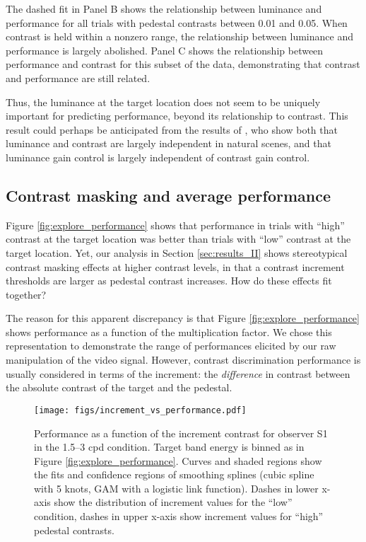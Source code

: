 \documentclass[11pt,a4paper]{article}
\begin{document}
{The dashed fit in Panel B shows the relationship between luminance and performance for all trials with pedestal contrasts between 0.01 and 0.05. 
When contrast is held within a nonzero range, the relationship between luminance and performance is largely abolished. Panel C shows the relationship between performance and contrast for this subset of the data, demonstrating that contrast and performance are still related. 

Thus, the luminance at the target location does not seem to be uniquely important for predicting performance, beyond its relationship to contrast. 
This result could perhaps be anticipated from the results of \citet{Mante2005}, who show both that luminance and contrast are largely independent in natural scenes, and that luminance gain control is largely independent of contrast gain control. 


\subsection{Contrast masking and average performance}
\label{app:contrast_masking}

Figure \ref{fig:explore_performance} shows that performance in trials with ``high'' contrast at the target location was better than trials with ``low'' contrast at the target location.
Yet, our analysis in Section \ref{sec:results_II} shows stereotypical contrast masking effects at higher contrast levels, in that a contrast increment thresholds are larger as pedestal contrast increases. 
How do these effects fit together?

The reason for this apparent discrepancy is that Figure \ref{fig:explore_performance} shows performance as a function of the multiplication factor. 
We chose this representation to demonstrate the range of performances elicited by our raw manipulation of the video signal. 
However, contrast discrimination performance is usually considered in terms of the increment: the \textit{difference} in contrast between the absolute contrast of the target and the pedestal.

\begin{figure}[H]
\texttt{[image: figs/increment\_vs\_performance.pdf]}
\centering
\caption{
Performance as a function of the increment contrast for observer S1 in the 1.5--3 cpd condition.
Target band energy is binned as in Figure \ref{fig:explore_performance}.
Curves and shaded regions show the fits and confidence regions of smoothing splines (cubic spline with 5 knots, GAM with a logistic link function).
Dashes in lower x-axis show the distribution of increment values for the “low” condition, dashes in upper x-axis show increment values for “high” pedestal contrasts.
}
\label{fig:performance_by_increment}
\end{figure}

}
\end{document}
